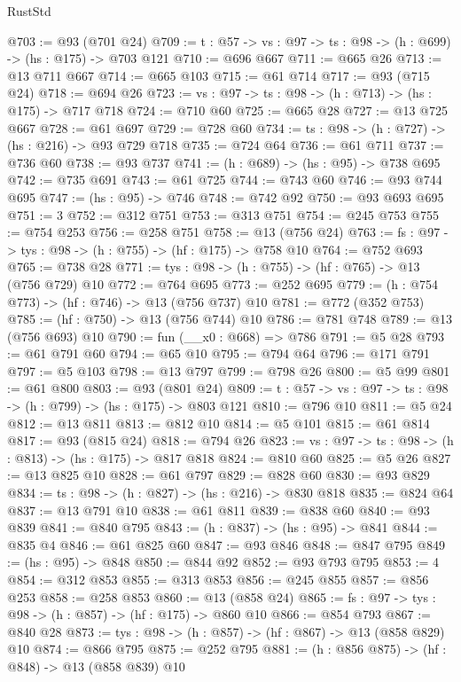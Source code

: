\begin{lexlean}{RustStd}
\begin{coremodule}
@703 := @93 (@701 @24)
@709 := {t : @57} -> {vs : @97} -> {ts : @98} -> (h : @699) -> (hs : @175) -> @703 @121
@710 := @696 @667
@711 := @665 @26
@713 := @13 @711 @667
@714 := @665 @103
@715 := @61 @714
@717 := @93 (@715 @24)
@718 := @694 @26
@723 := {vs : @97} -> {ts : @98} -> (h : @713) -> (hs : @175) -> @717 @718
@724 := @710 @60
@725 := @665 @28
@727 := @13 @725 @667
@728 := @61 @697
@729 := @728 @60
@734 := {ts : @98} -> (h : @727) -> (hs : @216) -> @93 @729 @718
@735 := @724 @64
@736 := @61 @711
@737 := @736 @60
@738 := @93 @737
@741 := (h : @689) -> (hs : @95) -> @738 @695
@742 := @735 @691
@743 := @61 @725
@744 := @743 @60
@746 := @93 @744 @695
@747 := (hs : @95) -> @746
@748 := @742 @92
@750 := @93 @693 @695
@751 := 3
@752 := @312 @751
@753 := @313 @751
@754 := @245 @753
@755 := @754 @253
@756 := @258 @751
@758 := @13 (@756 @24)
@763 := {fs : @97} -> {tys : @98} -> (h : @755) -> (hf : @175) -> @758 @10
@764 := @752 @693
@765 := @738 @28
@771 := {tys : @98} -> (h : @755) -> (hf : @765) -> @13 (@756 @729) @10
@772 := @764 @695
@773 := @252 @695
@779 := (h : @754 @773) -> (hf : @746) -> @13 (@756 @737) @10
@781 := @772 (@352 @753)
@785 := (hf : @750) -> @13 (@756 @744) @10
@786 := @781 @748
@789 := @13 (@756 @693) @10
@790 := fun (__x0 : @668) => @786
@791 := @5 @28
@793 := @61 @791 @60
@794 := @65 @10
@795 := @794 @64
@796 := @171 @791
@797 := @5 @103
@798 := @13 @797
@799 := @798 @26
@800 := @5 @99
@801 := @61 @800
@803 := @93 (@801 @24)
@809 := {t : @57} -> {vs : @97} -> {ts : @98} -> (h : @799) -> (hs : @175) -> @803 @121
@810 := @796 @10
@811 := @5 @24
@812 := @13 @811
@813 := @812 @10
@814 := @5 @101
@815 := @61 @814
@817 := @93 (@815 @24)
@818 := @794 @26
@823 := {vs : @97} -> {ts : @98} -> (h : @813) -> (hs : @175) -> @817 @818
@824 := @810 @60
@825 := @5 @26
@827 := @13 @825 @10
@828 := @61 @797
@829 := @828 @60
@830 := @93 @829
@834 := {ts : @98} -> (h : @827) -> (hs : @216) -> @830 @818
@835 := @824 @64
@837 := @13 @791 @10
@838 := @61 @811
@839 := @838 @60
@840 := @93 @839
@841 := @840 @795
@843 := (h : @837) -> (hs : @95) -> @841
@844 := @835 @4
@846 := @61 @825 @60
@847 := @93 @846
@848 := @847 @795
@849 := (hs : @95) -> @848
@850 := @844 @92
@852 := @93 @793 @795
@853 := 4
@854 := @312 @853
@855 := @313 @853
@856 := @245 @855
@857 := @856 @253
@858 := @258 @853
@860 := @13 (@858 @24)
@865 := {fs : @97} -> {tys : @98} -> (h : @857) -> (hf : @175) -> @860 @10
@866 := @854 @793
@867 := @840 @28
@873 := {tys : @98} -> (h : @857) -> (hf : @867) -> @13 (@858 @829) @10
@874 := @866 @795
@875 := @252 @795
@881 := (h : @856 @875) -> (hf : @848) -> @13 (@858 @839) @10

\end{coremodule}
\end{lexlean}
